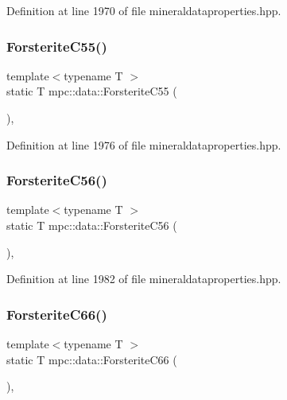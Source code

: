 Definition at line 1970 of file mineraldataproperties.\+hpp.

\mbox{\label{namespacempc_1_1data_a462d0d5086c7ba1936dfa26dc6bb5587}} 
\subsubsection{\texorpdfstring{Forsterite\+C55()}{ForsteriteC55()}}
{\footnotesize\ttfamily template$<$typename T $>$ \\
static T mpc\+::data\+::\+Forsterite\+C55 (\begin{DoxyParamCaption}{ }\end{DoxyParamCaption})\hspace{0.3cm}{\ttfamily [inline]}, {\ttfamily [static]}}



Definition at line 1976 of file mineraldataproperties.\+hpp.

\mbox{\label{namespacempc_1_1data_a1ab84de7461416b2196f6daa52e52cce}} 
\subsubsection{\texorpdfstring{Forsterite\+C56()}{ForsteriteC56()}}
{\footnotesize\ttfamily template$<$typename T $>$ \\
static T mpc\+::data\+::\+Forsterite\+C56 (\begin{DoxyParamCaption}{ }\end{DoxyParamCaption})\hspace{0.3cm}{\ttfamily [inline]}, {\ttfamily [static]}}



Definition at line 1982 of file mineraldataproperties.\+hpp.

\mbox{\label{namespacempc_1_1data_ae7578fb76679b399c76b66329d5f6f57}} 
\subsubsection{\texorpdfstring{Forsterite\+C66()}{ForsteriteC66()}}
{\footnotesize\ttfamily template$<$typename T $>$ \\
static T mpc\+::data\+::\+Forsterite\+C66 (\begin{DoxyParamCaption}{ }\end{DoxyParamCaption})\hspace{0.3cm}{\ttfamily [inline]}, {\ttfamily [static]}}



